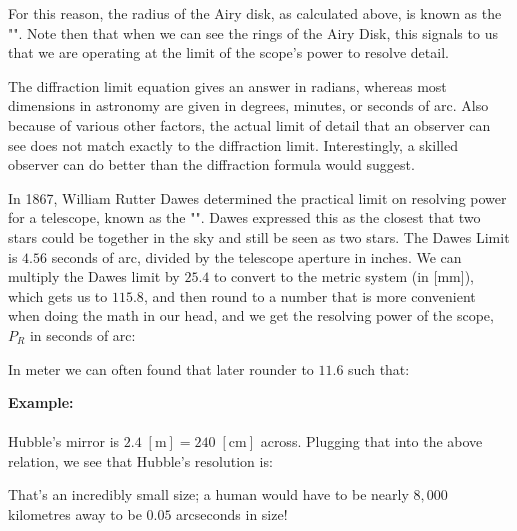 	For this reason, the radius of the Airy disk, as calculated above, is known as the "". Note then that when we can see the rings of the Airy Disk, this signals to us that we are operating at the limit of the scope's power to resolve detail.

	The diffraction limit equation gives an answer in radians, whereas most dimensions in astronomy are given in degrees, minutes, or seconds of arc. Also because of various other factors, the actual limit of detail that an observer can see does not match exactly to the diffraction limit. Interestingly, a skilled observer can do better than the diffraction formula would suggest.
	
	In 1867, William Rutter Dawes determined the practical limit on resolving power for a telescope, known as the "". Dawes expressed this as the closest that two stars could be together in the sky and still be seen as two stars. The Dawes Limit is $4.56$ seconds of arc, divided by the telescope aperture in inches. We can multiply the Dawes limit by $25.4$ to convert to the metric system (in [mm]), which gets us to $115.8$, and then round to a number that is more convenient when doing the math in our head, and we get the resolving power of the scope, $P_R$ in seconds of arc:
	
	In meter we can often found that later rounder to $11.6$ such that:
	
	\begin{tcolorbox}[colframe=black,colback=white,sharp corners]
	\textbf{{\Large {}}Example:}\\\\
	Hubble's mirror is $2.4\;[\text{m}] = 240\;[\text{cm}]$ across. Plugging that into the above relation, we see that Hubble’s resolution is:
	
	That's an incredibly small size; a human would have to be nearly $8,000$ kilometres away to be $0.05$ arcseconds in size!
	\end{tcolorbox}
	
